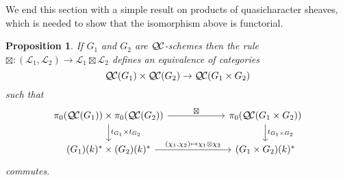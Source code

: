 \documentclass{amsart}
\theoremstyle{plain}
\newtheorem{proposition}[theorem]{Proposition}
\theoremstyle{definition}
\theoremstyle{remark}
\newcommand{\Fq}{k}
\newcommand{\qcs}[1]{{\mathcal{#1}}}
\newcommand{\QC}{{\mathcal{Q\hskip-0.8pt C}}}
\newcommand{\QCiso}[1]{\pi_0 (\QC(#1))}
\newcommand{\trFrob}[1]{t_{#1}}
\begin{document}
We end this section with a simple result on products of quasicharacter sheaves,
which is needed to show that the isomorphism above is functorial.

\begin{proposition}\label{prop:product}
If $G_1$ and $G_2$ are $\QC$-schemes then the rule
$\boxtimes : (\qcs{L}_1,\qcs{L}_2)\to \qcs{L}_1\boxtimes\qcs{L}_2$ defines an equivalence of categories 
\[
\QC(G_1)\times \QC(G_2) \to \QC(G_1\times G_2)
\]
such that 
\[
\begin{tikzcd}[column sep=60]
\arrow{d}{\trFrob{G_1} \times \trFrob{G_2}} \QCiso{G_1}\times \QCiso{G_2} \arrow{r}{\boxtimes}
& \arrow{d}{\trFrob{G_1\times G_2}} \QCiso{G_1\times G_2}\\
(G_1)(\Fq)^*\times (G_2)(\Fq)^* \arrow{r}{(\chi_1,\chi_2)\mapsto \chi_1\otimes \chi_2}  & (G_1\times G_2)(\Fq)^*
\end{tikzcd}
\]
commutes.
\end{proposition}
\end{document}
